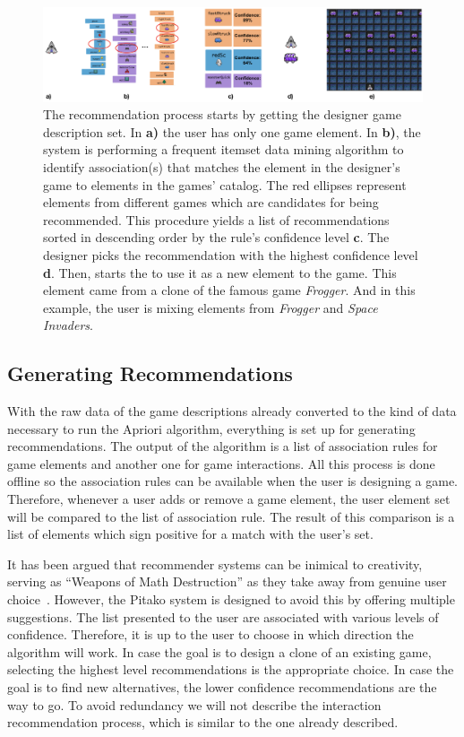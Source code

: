 \documentclass[letterpaper]{article} %
\begin{document}
\begin{figure}[ht]
  \includegraphics[width=\linewidth]{process.png}
  \caption{The recommendation process starts by getting the designer game description set. In \textbf{a)} the user has only one game element. In \textbf{b)}, the system is performing a frequent itemset data mining algorithm to identify association(s) that matches the element in the designer's game to elements in the games' catalog. The red ellipses represent elements from different games which are candidates for being recommended. This procedure yields a list of recommendations sorted in descending order by the rule's confidence level \textbf{c}. The designer picks the recommendation with the highest confidence level \textbf{d}. Then, starts the to use it as a new element to the game. This element came from a clone of the famous game \textit{Frogger}. And in this example, the user is mixing elements from \textit{Frogger} and \textit{Space Invaders}.}
  \label{process}
\end{figure}

\subsection{Generating Recommendations}
With the raw data of the game descriptions already converted to the kind of data necessary to run the Apriori algorithm, everything is set up for generating recommendations. The output of the algorithm is a list of association rules for game elements and another one for game interactions. All this process is done offline so the association rules can be available when the user is designing a game. Therefore, whenever a user adds or remove a game element, the user element set will be compared to the list of association rule. The result of this comparison is a list of elements which sign positive for a match with the user's set.

It has been argued that recommender systems can be inimical to creativity, serving as ``Weapons of Math Destruction'' as they take away from genuine user choice~\cite{o2017weapons}. However, the Pitako system is designed to avoid this by offering multiple suggestions.  The list presented to the user are associated with various levels of confidence. Therefore, it is up to the user to choose in which direction the algorithm will work. In case the goal is to design a clone of an existing game, selecting the highest level recommendations is the appropriate choice. In case the goal is to find new alternatives, the lower confidence recommendations are the way to go. To avoid redundancy we will not describe the interaction recommendation process, which is similar to the one already described.
\end{document}
